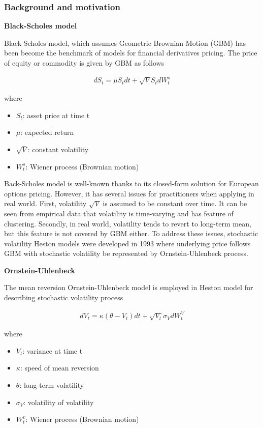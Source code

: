 \documentclass[12pt,a4paper]{article}
\numberwithin{equation}{section}
\begin{document}
\subsubsection{Background and motivation}

\vspace{0.5cm}
\hspace{2em} \textbf{Black-Scholes model}

Black-Scholes model, which assumes Geometric Brownian Motion (GBM) has been become the benchmark of models for financial derivatives pricing. The price of equity or commodity is given by GBM as follows

\begin{align*}
dS_t = \mu S_t dt + \sqrt{V} S_t dW_t^s
\end{align*}

where 

\begin{itemize}
\item $S_t$: asset price at time t
\item $\mu$: expected return
\item $\sqrt{V}$: constant volatility
\item $W_t^s$: Wiener process (Brownian motion)
\end{itemize}

Back-Scholes model is well-known thanks to its closed-form solution for European options pricing. However, it has several issues for practitioners when applying in real world. First, volatility $\sqrt{V}$ is assumed to be constant over time. It can be seen from empirical data that volatility is time-varying and has feature of clustering. Secondly, in real world, volatility tends to revert to long-term mean, but this feature is not covered by GBM either. To address these issues, stochastic volatility Heston models were developed in 1993 where underlying price follows GBM with stochastic volatility be represented by Ornstein-Uhlenbeck process.

\vspace{0.5cm}
\textbf{Ornstein-Uhlenbeck}

The mean reversion Ornstein-Uhlenbeck model is employed in Heston model for describing stochastic volatility process

\begin{align*}
dV_t = \kappa (\theta - V_t) dt + \sqrt{V_t} \sigma_V dW_t^V 
\end{align*}

where 
\begin{itemize}
\item $V_t$: variance at time t
\item $\kappa$: speed of mean reversion
\item $\theta$: long-term volatility
\item $\sigma_V$: volatility of volatility
\item $W_t^v$: Wiener process (Brownian motion)
\end{itemize}
\end{document}
